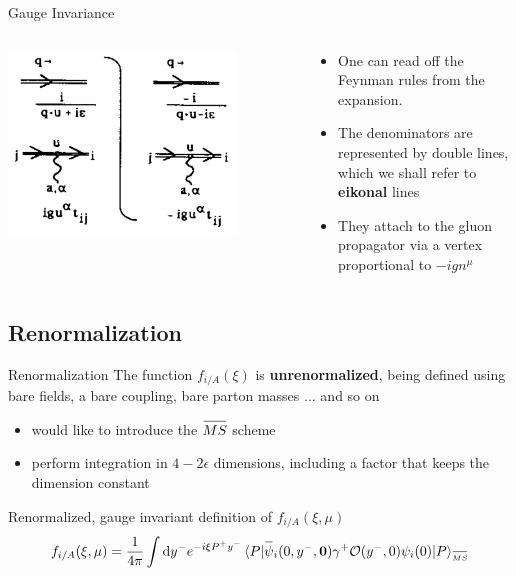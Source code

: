 \documentclass[aspectratio=169,xcolor=dvipsnames]{beamer}
\newcommand{\overbar}[1]{
	\mkern 1.5mu \overline{\mkern-1.5mu\raisebox{0pt}[\dimexpr\height+0.5mm\relax]{$#1$}\mkern-1.5mu}\mkern 1.5mu
}
\newcommand*\dif{\mathop{}\!\mathrm{d}}
\begin{document}
\begin{frame}{Gauge Invariance}
	\begin{columns}[T]
		\begin{column}{.5\textwidth}
			\centering
			\includegraphics[width=0.8\textwidth]{feyn}
		\end{column}
		\begin{column}{.5\textwidth}
			\begin{itemize}
				\item One can read off the Feynman rules from the expansion.
				\item The \alert{denominators} are represented by double lines, which we shall refer to \textbf{eikonal} lines
				\item They attach to the gluon propagator via a vertex proportional to $-ign^\mu$
			\end{itemize}
		\end{column}
	\end{columns}
\end{frame}

\subsection{Renormalization}

\begin{frame}{Renormalization}
	The function $f_{i/A}(\xi)$ is \textbf{unrenormalized}, being defined using bare fields, a bare coupling, bare parton masses ... and so on
	\begin{itemize}
		\item would like to introduce the $\overbar{MS}$ scheme
		\item perform integration in $4-2\epsilon$ dimensions, including a factor that keeps the dimension constant
	\end{itemize}\vskip0.15in

	\begin{block}{Renormalized, gauge invariant definition of $f_{i/A}(\xi,\mu)$}
		\begin{align*}
			f_{i/A}(\xi,\mu) = \frac{1}{4\pi} \int \dif y^- e^{-i\xi P^+ y^-} \braket{P|  \overbar{\psi}_i(0,y^-,\mathbf{0})\gamma^+\mathcal{O}(y^-,0)\psi_i(0) |P}_{\tiny\overbar{MS}}\\
		\end{align*}
	\end{block}
\end{frame}
\end{document}
